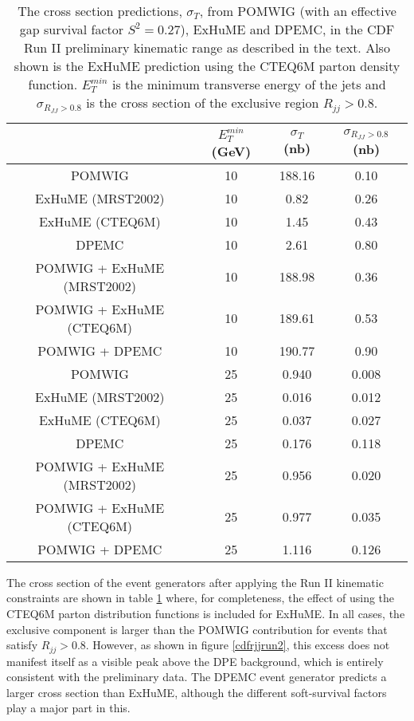 \begin{table}[t]
\centering
\begin{tabular}{| c | c | c | c |}
\hline
& $E_{T}^{min}$ (GeV)   & $\sigma_{T}$ (nb) & $\sigma_{R_{JJ} > 0.8}$ (nb) \\
\hline 
POMWIG & 10 & 188.16 & 0.10  \\ 
ExHuME (MRST2002) & 10 &   0.82 & 0.26 \\
ExHuME (CTEQ6M) & 10 &   1.45 & 0.43 \\
DPEMC & 10 & 2.61 & 0.80\\
POMWIG + ExHuME (MRST2002) & 10 & 188.98 & 0.36  \\ 
POMWIG + ExHuME (CTEQ6M) & 10 & 189.61 & 0.53  \\ 
POMWIG + DPEMC & 10 & 190.77 &  0.90 \\ 
\hline
POMWIG & 25 &  0.940 & 0.008 \\ 
ExHuME (MRST2002) & 25 & 0.016 & 0.012\\
ExHuME (CTEQ6M) & 25 & 0.037 & 0.027\\
DPEMC & 25 & 0.176 & 0.118\\
POMWIG + ExHuME (MRST2002) & 25 & 0.956 & 0.020\\
POMWIG + ExHuME (CTEQ6M) & 25 & 0.977 & 0.035\\
POMWIG + DPEMC & 25 & 1.116 & 0.126\\
\hline
\end{tabular}
\caption[The predicted cross sections for CDF Run II]{The cross section predictions, $\sigma_T$, from POMWIG (with an effective gap survival factor $S^2 = 0.27$), ExHuME and DPEMC, in the CDF Run II preliminary kinematic range as described in the text. Also shown is the ExHuME prediction using the CTEQ6M parton density function. $E_{T}^{min}$ is the minimum transverse energy of the jets and  $\sigma_{R_{JJ} > 0.8}$ is the cross section of the exclusive region $R_{jj}>0.8$. \label{cdfrun2xs}} 
\end{table}%

The cross section of the event generators after applying the Run II kinematic constraints are shown in table \ref{cdfrun2xs} where, for completeness, the effect of using the CTEQ6M parton distribution functions is included for ExHuME. In all cases, the exclusive component is larger than the POMWIG contribution for events that satisfy $R_{jj}>0.8$. However, as shown in figure \ref{cdfrjjrun2}, this excess does not manifest itself as a visible peak above the DPE background, which is entirely consistent with the preliminary data. The DPEMC event generator predicts a larger cross section than ExHuME, although the different soft-survival factors play a major part in this.


